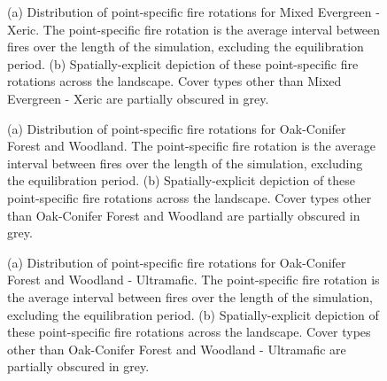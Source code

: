 \begin{figure}[!htbp]
  \centering
  \caption{(a) Distribution of point-specific fire rotations for Mixed Evergreen - Xeric. The point-specific fire rotation is the average interval between fires over the length of the simulation, excluding the equilibration period. (b) Spatially-explicit depiction of these point-specific fire rotations across the landscape. Cover types other than Mixed Evergreen - Xeric are partially obscured in grey.}
\label{fig:preturn_megx}
\end{figure}

\begin{figure}[!htbp]
  \centering
  \caption{(a) Distribution of point-specific fire rotations for Oak-Conifer Forest and Woodland. The point-specific fire rotation is the average interval between fires over the length of the simulation, excluding the equilibration period. (b) Spatially-explicit depiction of these point-specific fire rotations across the landscape. Cover types other than Oak-Conifer Forest and Woodland are partially obscured in grey.}
\label{fig:preturn_ocfw}
\end{figure}

\begin{figure}[!htbp]
  \centering
  \caption{(a) Distribution of point-specific fire rotations for Oak-Conifer Forest and Woodland - Ultramafic. The point-specific fire rotation is the average interval between fires over the length of the simulation, excluding the equilibration period. (b) Spatially-explicit depiction of these point-specific fire rotations across the landscape. Cover types other than Oak-Conifer Forest and Woodland - Ultramafic are partially obscured in grey.}
\label{fig:preturn_ocfwu}
\end{figure}


